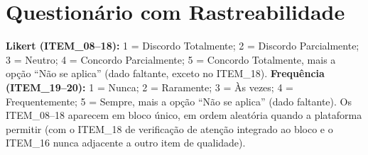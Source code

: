\section{Questionário com Rastreabilidade}

\textbf{Likert (ITEM\_08--18):} 1 = Discordo Totalmente; 2 = Discordo Parcialmente; 3 = Neutro; 4 = Concordo Parcialmente; 5 = Concordo Totalmente, mais a opção \enquote{Não se aplica} (dado faltante, exceto no ITEM\_18). \textbf{Frequência (ITEM\_19--20):} 1 = Nunca; 2 = Raramente; 3 = Às vezes; 4 = Frequentemente; 5 = Sempre, mais a opção \enquote{Não se aplica} (dado faltante). Os ITEM\_08--18 aparecem em bloco único, em ordem aleatória quando a plataforma permitir (com o ITEM\_18 de verificação de atenção integrado ao bloco e o ITEM\_16 nunca adjacente a outro item de qualidade).

